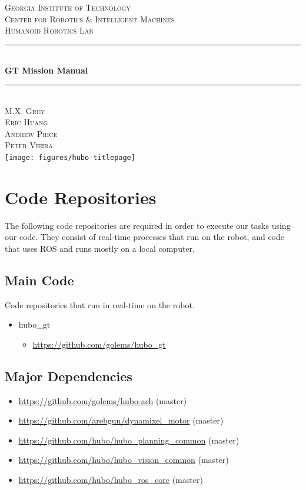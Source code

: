 \documentclass[letterpaper, 10 pt]{report}
\begin{document}
\begin{titlepage}
\center
\textsc{\LARGE Georgia Institute of Technology}\\[1.5cm]
\textsc{\large Center for Robotics \& Intelligent Machines}\\[0.5cm]
\textsc{\large Humanoid Robotics Lab}\\[0.5cm]
\rule{\linewidth}{0.5mm}\\[0.4cm]
{\huge \bfseries GT Mission Manual}\\[0.4cm]
\rule{\linewidth}{0.5mm}\\[1.5cm]
\textsc{\normalsize M.X. Grey}\\
\textsc{\normalsize Eric Huang}\\
\textsc{\normalsize Andrew Price}\\
\textsc{\normalsize Peter Vieira}\\[1.5cm]
\texttt{[image: figures/hubo-titlepage]}
\vfill
\end{titlepage}


\tableofcontents
\newpage


%
\chapter{Code Repositories}\label{chap:code-repos}
The following code repositories are required in order to execute our tasks using our code. They consist of real-time processes that run on the robot, and code that uses ROS and runs mostly on a local computer.
\section{Main Code}
Code repositories that run in real-time on the robot.
\begin{itemize}
\item hubo\_gt
  \begin{itemize}
	\item \url{https://github.com/golems/hubo_gt}
  \end{itemize}
\end{itemize}
\section{Major Dependencies}
\begin{itemize}
  \item \url{https://github.com/golems/hubo-ach} (master)
  \item \url{https://github.com/arebgun/dynamixel_motor} (master)
  \item \url{https://github.com/hubo/hubo_planning_common} (master)
  \item \url{https://github.com/hubo/hubo_vision_common} (master)
  \item \url{https://github.com/hubo/hubo_ros_core} (master)
\end{itemize}
\end{document}
